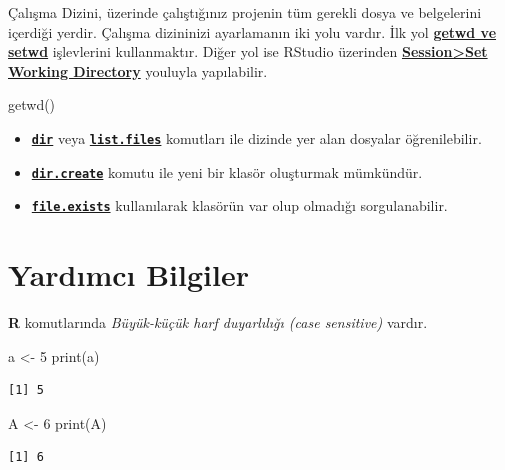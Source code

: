 \documentclass[
  letterpaper,
  DIV=11,
  numbers=noendperiod]{scrreprt}
\newenvironment{Shaded}{\begin{snugshade}}{\end{snugshade}}
\newcommand{\DecValTok}[1]{\textcolor[rgb]{0.68,0.00,0.00}{#1}}
\newcommand{\FunctionTok}[1]{\textcolor[rgb]{0.28,0.35,0.67}{#1}}
\newcommand{\NormalTok}[1]{\textcolor[rgb]{0.00,0.23,0.31}{#1}}
\newcommand{\OtherTok}[1]{\textcolor[rgb]{0.00,0.23,0.31}{#1}}
\begin{document}
Çalışma Dizini, üzerinde çalıştığınız projenin tüm gerekli dosya ve
belgelerini içerdiği yerdir. Çalışma dizininizi ayarlamanın iki yolu
vardır. İlk yol \ul{\textbf{getwd ve setwd}} işlevlerini kullanmaktır.
Diğer yol ise RStudio üzerinden \ul{\textbf{Session\textgreater Set
Working Directory}} youluyla yapılabilir.

\begin{Shaded}
\begin{Highlighting}[]
\FunctionTok{getwd}\NormalTok{()}
\end{Highlighting}
\end{Shaded}

\begin{itemize}
\item
  \ul{\textbf{\mbox{\texttt{dir}}}} veya
  \ul{\textbf{\mbox{\texttt{list.files}}}} komutları ile dizinde yer
  alan dosyalar öğrenilebilir.
\item
  \ul{\textbf{\mbox{\texttt{dir.create}}}} komutu ile yeni bir klasör
  oluşturmak mümkündür.
\item
  \ul{\textbf{\mbox{\texttt{file.exists}}}} kullanılarak klasörün var
  olup olmadığı sorgulanabilir.
\end{itemize}

\section{Yardımcı Bilgiler}\label{yardux131mcux131-bilgiler}

\textbf{R} komutlarında \emph{Büyük-küçük harf duyarlılığı (case
sensitive)} vardır.

\begin{Shaded}
\begin{Highlighting}[]
\NormalTok{a }\OtherTok{\textless{}{-}} \DecValTok{5}  
\FunctionTok{print}\NormalTok{(a)  }
\end{Highlighting}
\end{Shaded}

\begin{verbatim}
[1] 5
\end{verbatim}

\begin{Shaded}
\begin{Highlighting}[]
\NormalTok{A }\OtherTok{\textless{}{-}} \DecValTok{6}  
\FunctionTok{print}\NormalTok{(A) }
\end{Highlighting}
\end{Shaded}

\begin{verbatim}
[1] 6
\end{verbatim}
\end{document}
